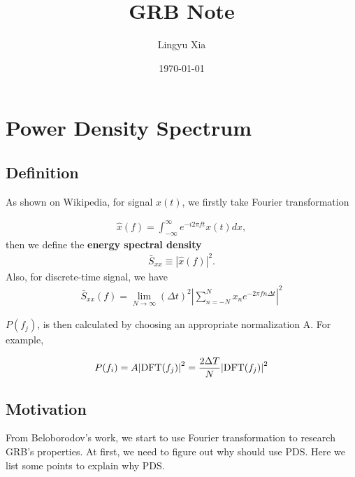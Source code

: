 \documentclass[prd,11pt]{revtex4-2}
\begin{document}

\begin{CJK*}{GB}{}
    \title{GRB Note}
    \date{\today}
    \author{Lingyu Xia}
    \maketitle
\end{CJK*}

\tableofcontents
\section{Power Density Spectrum}

\subsection{Definition}

As shown on Wikipedia, for signal $x(t)$, we firstly take Fourier transformation

\begin{align}
    \hat{x}(f)=\int^{\infty}_{-\infty}  e^{-i2\pi f t}x(t)dx,
\end{align}
then we define the \textbf{energy spectral density}
\begin{align}
    \bar{S}_{x x} \equiv |\hat{x}(f)|^{2}.
\end{align} 
Also, for discrete-time signal, we have
\begin{align}
    \bar{S}_{x x}(f)=\lim_{N\rightarrow \infty}(\Delta t)^{2}\left|\sum_{n=-N}^{N}x_{n}e^{-2\pi fn\Delta t}\right|^{2}
\end{align}

$P(f_{j})$, is then calculated by choosing an appropriate normalization A. For example,

\begin{align}
    P(f_{i})=A\abs{\text{DFT}(f_{j})}^{2}=\frac{2\Delta T}{N}\abs{\text{DFT}(f_{j})}^{2}
\end{align}
\subsection{Motivation}

From Beloborodov's work\cite{Beloborodov:1998ai}, we start to use Fourier transformation to research GRB's properties. At first, we need to figure out why should use PDS. Here we list some points to explain why PDS.
\end{document}
